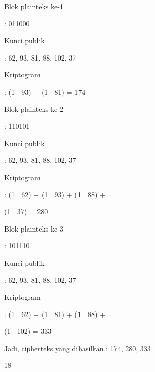 \documentclass{article}
\begin{document}

Blok plainteks ke-1 

: 011000 

 Kunci publik  

: 62, 93, 81, 88, 102, 37

 Kriptogram 


: (1  93) + (1  81)  = 174

Blok plainteks ke-2 

: 110101 

 Kunci publik  

: 62, 93, 81, 88, 102, 37

 Kriptogram 


: (1  62) + (1  93) + (1  88) + 




  (1  37)  = 280

Blok plainteks ke-3 

: 101110 

 Kunci publik  

: 62, 93, 81, 88, 102, 37

 Kriptogram 


: (1  62) + (1  81) + (1  88) + 




  (1  102)  = 333

 Jadi, cipherteks yang dihasilkan : 174, 280, 333

18
\end{document}
